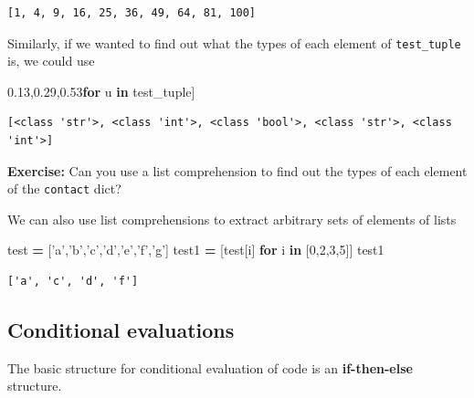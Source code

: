 \documentclass[
  letterpaper,
]{scrbook}
\newenvironment{Shaded}{\begin{snugshade}}{\end{snugshade}}
\newcommand{\BuiltInTok}[1]{#1}
\newcommand{\ControlFlowTok}[1]{\textcolor[rgb]{0.13,0.29,0.53}{\textbf{#1}}}
\newcommand{\DecValTok}[1]{\textcolor[rgb]{0.00,0.00,0.81}{#1}}
\newcommand{\KeywordTok}[1]{\textcolor[rgb]{0.13,0.29,0.53}{\textbf{#1}}}
\newcommand{\NormalTok}[1]{#1}
\newcommand{\OperatorTok}[1]{\textcolor[rgb]{0.81,0.36,0.00}{\textbf{#1}}}
\newcommand{\StringTok}[1]{\textcolor[rgb]{0.31,0.60,0.02}{#1}}
\begin{document}
\begin{verbatim}
[1, 4, 9, 16, 25, 36, 49, 64, 81, 100]
\end{verbatim}

Similarly, if we wanted to find out what the types of each element of \texttt{test\_tuple} is, we could use

\begin{Shaded}
\begin{Highlighting}[]
\NormalTok{[}\BuiltInTok{type}\NormalTok{(u) }\ControlFlowTok{for}\NormalTok{ u }\KeywordTok{in}\NormalTok{ test_tuple]}
\end{Highlighting}
\end{Shaded}

\begin{verbatim}
[<class 'str'>, <class 'int'>, <class 'bool'>, <class 'str'>, <class 'int'>]
\end{verbatim}

\textbf{Exercise:} Can you use a list comprehension to find out the types of each element of the \texttt{contact} dict?

We can also use list comprehensions to extract arbitrary sets of elements of lists

\begin{Shaded}
\begin{Highlighting}[]
\NormalTok{test }\OperatorTok{=}\NormalTok{ [}\StringTok{'a'}\NormalTok{,}\StringTok{'b'}\NormalTok{,}\StringTok{'c'}\NormalTok{,}\StringTok{'d'}\NormalTok{,}\StringTok{'e'}\NormalTok{,}\StringTok{'f'}\NormalTok{,}\StringTok{'g'}\NormalTok{]}
\NormalTok{test1 }\OperatorTok{=}\NormalTok{ [test[i] }\ControlFlowTok{for}\NormalTok{ i }\KeywordTok{in}\NormalTok{ [}\DecValTok{0}\NormalTok{,}\DecValTok{2}\NormalTok{,}\DecValTok{3}\NormalTok{,}\DecValTok{5}\NormalTok{]]}
\NormalTok{test1}
\end{Highlighting}
\end{Shaded}

\begin{verbatim}
['a', 'c', 'd', 'f']
\end{verbatim}

\hypertarget{conditional-evaluations}{%
\subsection{Conditional evaluations}\label{conditional-evaluations}}

The basic structure for conditional evaluation of code is an \textbf{if-then-else} structure.
\end{document}
